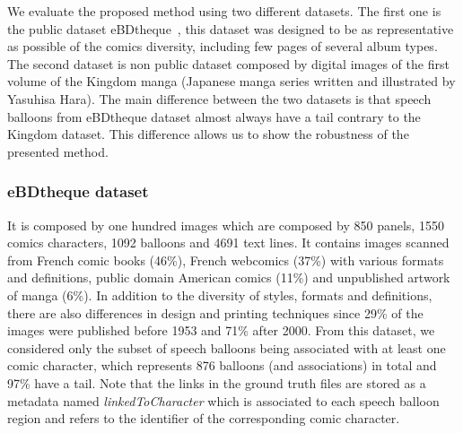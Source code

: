 \documentclass[conference]{IEEEtran}
\begin{document}
We evaluate the proposed method using two different datasets.
The first one is the public dataset eBDtheque~\cite{Guerin2013}, this dataset was designed to be as representative as possible of the comics diversity, including few pages of several album types.
The second dataset is non public dataset composed by digital images of the first volume of the Kingdom manga (Japanese manga series written and illustrated by Yasuhisa Hara).
The main difference between the two datasets is that speech balloons from eBDtheque dataset almost always have a tail contrary to the Kingdom dataset.
This difference allows us to show the robustness of the presented method.


\subsubsection{eBDtheque dataset} %
\label{ssub:ebdtheque_dataset}

It is composed by one hundred images which are composed by 850 panels, 1550 comics characters, 1092 balloons and 4691 text lines.
It contains images scanned from French comic books (46\%), French webcomics (37\%) with various formats and definitions, public domain American comics (11\%) and unpublished artwork of manga (6\%).
In addition to the diversity of styles, formats and definitions, there are also differences in design and printing techniques since 29\% of the images were published before 1953 and 71\% after 2000.
From this dataset, we considered only the subset of speech balloons being associated with at least one comic character, which represents 876 balloons (and associations) in total and 97\% have a tail.
Note that the links in the ground truth files are stored as a metadata named \emph{linkedToCharacter} which is associated to each speech balloon region and refers to the identifier of the corresponding comic character.%


\end{document}
